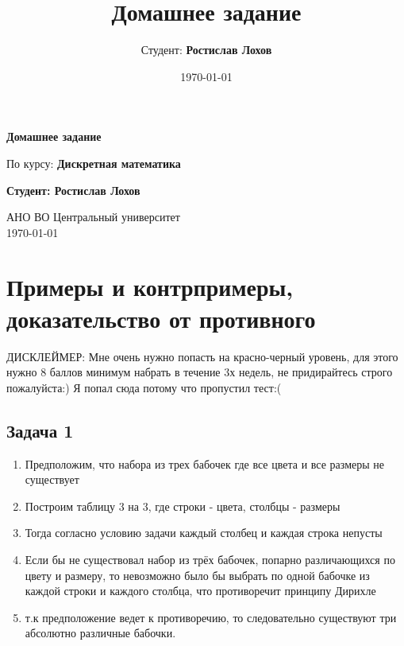 \documentclass[a4paper,12pt]{article}
\title{Домашнее задание}
\author{Студент: \textbf{Ростислав Лохов}}
\date{\today}
\begin{document}
\begin{titlepage}
    \centering
    \vspace*{1cm}

    \Huge
    \textbf{Домашнее задание}

    \vspace{0.5cm}
    \LARGE
    По курсу: \textbf{Дискретная математика}

    \vspace{1.5cm}

    \textbf{Студент: Ростислав Лохов}

    \vfill

    \Large
    АНО ВО Центральный университет\\
    \vspace{0.3cm}
    \today

\end{titlepage}

\tableofcontents
\newpage

\section{Примеры и контрпримеры, доказательство от противного}

ДИСКЛЕЙМЕР: Мне очень нужно попасть на красно-черный уровень, для этого нужно 8  баллов минимум набрать в течение 3х недель, не придирайтесь строго пожалуйста:) Я попал сюда потому что пропустил тест:(

\subsection{Задача 1}
\begin{enumerate}
    \item Предположим, что набора из трех бабочек где все цвета и все размеры не существует
    \item Построим таблицу 3 на 3, где строки - цвета, столбцы - размеры
    \item Тогда согласно условию задачи каждый столбец и каждая строка непусты
    \item Если бы не существовал набор из трёх бабочек, попарно различающихся по цвету и размеру, то невозможно было бы выбрать по одной бабочке из каждой строки и каждого столбца, что противоречит принципу Дирихле
    \item т.к предположение ведет к противоречию, то следовательно существуют три абсолютно различные бабочки.
\end{enumerate}
\end{document}
